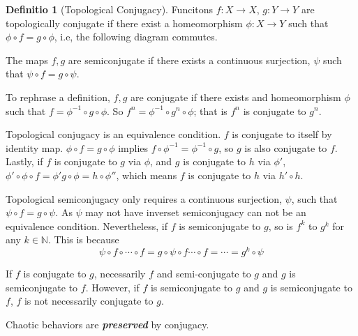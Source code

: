 \documentclass{report}
\theoremstyle{definition}
\newtheorem{defn}[thm]{Definitio}
\theoremstyle{definition}
\theoremstyle{remark}
\renewcommand{\emph}[1]{\textbf{\textit{#1}}}
\newcommand{\bb}[1]{\mathbb{#1}} %
\begin{document}
\begin{defn}[Topological Conjugacy]
Funcitons $f: X \rightarrow X$, $g:  Y \rightarrow Y$ are topologically conjugate if there exist a homeomorphism $\phi: X \rightarrow Y$ such that 
$\phi \circ f = g \circ \phi$,
i.e, the following diagram commutes.
\begin{center}
\end{center}

The maps $f,g$ are semiconjugate if there exists a continuous surjection, $\psi$ such that $\psi \circ f = g \circ \psi$.
\end{defn}


To rephrase a definition, $f,g$ are conjugate if there exists and homeomorphism $\phi$ such that $f = \phi^{-1} \circ g \circ \phi$.
So $f^{n} = \phi^{-1} \circ g^{n} \circ \phi$; that is $f^n$ is conjugate to $g^n$.

Topological conjugacy is an equivalence condition. 
$f$ is conjugate to itself by identity map. 
$\phi \circ f = g \circ \phi$ implies $f \circ \phi^{-1} = \phi^{-1} \circ g$, so $g$ is also conjugate to $f$.
Lastly, if $f$  is conjugate to $g$ via $\phi$, and $g$ is conjugate to $h$ via $\phi'$, $\phi' \circ \phi \circ f = \phi' g \circ \phi = h \circ \phi'' $, which means $f$ is conjugate to $h$ via $h' \circ h$.

Topological semiconjugacy only requires a continuous surjection, $\psi$, such that $\psi \circ f = g \circ \psi$. 
As $\psi$ may not have inverset semiconjugacy can not be an equivalence condition.
Nevertheless, if $f$ is semiconjugate to $g$, so is $f^{k}$ to $g^{k}$ for any $k \in \bb{N}$. 
This is because 
$$
	\psi \circ f\circ \cdots \circ f = g \circ \psi \circ f \cdots \circ f = \cdots = g^k \circ \psi
$$

If $f$ is conjugate to $g$, necessarily $f$ and semi-conjugate to $g$ and $g$ is semiconjugate to $f$. 
However, if $f$ is semiconjugate to $g$ and $g$ is semiconjugate to $f$, $f$ is not necessarily conjugate to $g$. 

Chaotic behaviors are \emph{preserved} by conjugacy.
\end{document}
